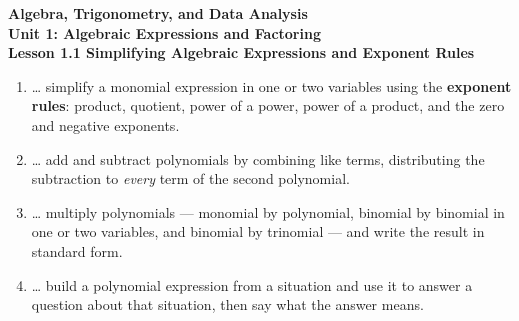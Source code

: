 \documentclass[10pt]{article}
\begin{document}
\vspace{-0.8in}

\begin{center}
  {\color{white}\textbf{\LARGE Algebra, Trigonometry, and Data Analysis}}\\[4pt]
  {\color{mistmid}\large\textbf{Unit 1: Algebraic Expressions and Factoring}}\\[6pt]
  {\color{white}\textbf{\large Lesson 1.1 \quad Simplifying Algebraic Expressions and Exponent Rules}}
\end{center}

\vspace{0.22in}
\namedateperiod
\vspace{0.18in}

\begin{learningtargetbox}
\small
\begin{enumerate}[leftmargin=1.5em, itemsep=5pt]
  \item \ldots{} simplify a monomial expression in one or two variables using the
        \textbf{exponent rules}: product, quotient, power of a power, power of a product, and
        the zero and negative exponents.
  \item \ldots{} add and subtract polynomials by combining like terms, distributing the
        subtraction to \emph{every} term of the second polynomial.
  \item \ldots{} multiply polynomials --- monomial by polynomial, binomial by binomial in one
        or two variables, and binomial by trinomial --- and write the result in standard form.
  \item \ldots{} build a polynomial expression from a situation and use it to answer a
        question about that situation, then say what the answer means.
\end{enumerate}
\end{learningtargetbox}

\vspace{0.14in}
\end{document}
